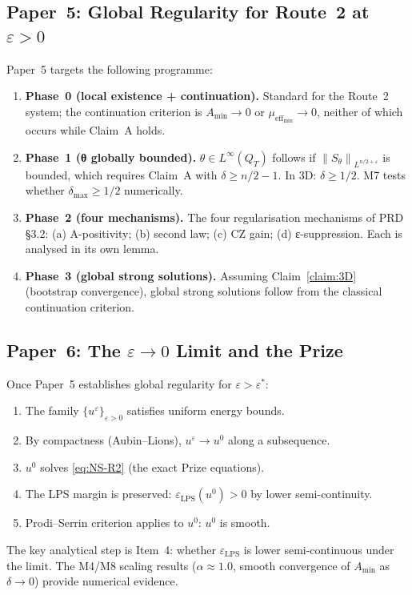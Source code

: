 \documentclass[11pt]{article}
\theoremstyle{definition}
\theoremstyle{remark}
\newcommand{\norm}[1]{\left\|#1\right\|}
\newcommand{\eps}{\varepsilon}
\newcommand{\mueff}{\mu_{\mathrm{eff}}}
\begin{document}
\subsection{Paper~5: Global Regularity for Route~2 at $\eps>0$}

Paper~5 targets the following programme:
\begin{enumerate}
\item \textbf{Phase~0 (local existence + continuation).}
  Standard for the Route~2 system; the continuation criterion is
  $A_{\min}\to 0$ or $\mueff_{\min}\to 0$, neither of which occurs while
  Claim~A holds.
\item \textbf{Phase~1 (θ globally bounded).}
  $\theta\in L^\infty(Q_T)$ follows if $\norm{S_\theta}_{L^{n/2+\eps}}$ is
  bounded, which requires Claim~A with $\delta\geq n/2-1$.  In 3D: $\delta\geq 1/2$.
  M7 tests whether $\delta_{\max}\geq 1/2$ numerically.
\item \textbf{Phase~2 (four mechanisms).}
  The four regularisation mechanisms of PRD §3.2:
  (a) A-positivity; (b) second law; (c) CZ gain; (d) ε-suppression.
  Each is analysed in its own lemma.
\item \textbf{Phase~3 (global strong solutions).}
  Assuming Claim~\ref{claim:3D} (bootstrap convergence), global strong
  solutions follow from the classical continuation criterion.
\end{enumerate}

\subsection{Paper~6: The $\eps\to 0$ Limit and the Prize}

Once Paper~5 establishes global regularity for $\eps>\eps^*$:
\begin{enumerate}
\item The family $\{u^\eps\}_{\eps>0}$ satisfies uniform energy bounds.
\item By compactness (Aubin--Lions), $u^\eps\to u^0$ along a subsequence.
\item $u^0$ solves \eqref{eq:NS-R2} (the exact Prize equations).
\item The LPS margin is preserved: $\eps_{\mathrm{LPS}}(u^0)>0$ by lower
  semi-continuity.
\item Prodi--Serrin criterion applies to $u^0$: $u^0$ is smooth.
\end{enumerate}
The key analytical step is Item~4: whether $\eps_{\mathrm{LPS}}$ is lower
semi-continuous under the limit.  The M4/M8 scaling results ($\alpha\approx 1.0$,
smooth convergence of $A_{\min}$ as $\delta\to 0$) provide numerical evidence.
\end{document}
